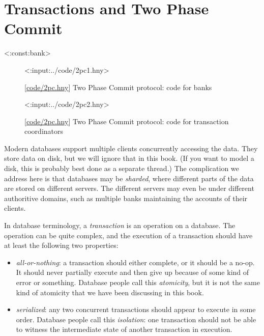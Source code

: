 \documentclass{report}
\newcommand{\harmonylink}[1]{%
[\href{https://harmony.cs.cornell.edu/#1}{\underline{#1}}]%
}
\newenvironment{code}{
\tcolorbox
}{
\endtcolorbox
}
\begin{document}
\chapter{Transactions and Two Phase Commit}
\label{ch:2pc}

<{:const:bank}>

\begin{figure}
\begin{code}
<{:input:../code/2pc1.hny}>
\end{code}
\caption{\harmonylink{code/2pc.hny} Two Phase Commit protocol: code for banks}
\label{fig:2pc1}
\end{figure}

\begin{figure}
\begin{code}
<{:input:../code/2pc2.hny}>
\end{code}
\caption{\harmonylink{code/2pc.hny} Two Phase Commit protocol: code for transaction coordinators}
\label{fig:2pc2}
\end{figure}

Modern databases support multiple clients concurrently accessing the data.
They store data on disk, but we will ignore that in this book.
(If you want to model a disk, this is probably best done as a separate
thread.)
The complication we address here is that databases may be \emph{sharded},
where different parts of the data are stored on different servers.
The different servers may even be under different
authoritive domains, such as multiple banks maintaining the accounts of their
clients.

In database terminology, a \emph{transaction} is an operation on a database.
The operation can be quite complex, and the execution of a transaction
should have at least the following two properties:
\begin{itemize}
\item \emph{all-or-nothing}: a transaction should either complete, or it should
be a no-op.  It should never partially execute and then give up because of
some kind of error or something.  Database
people call this \emph{atomicity}, but it is not the same kind of atomicity that
we have been discussing in this book.
\item \emph{serialized}: any two concurrent transactions should appear to
execute in some order.  Database people call this \emph{isolation}: one transaction
should not be able to witness the intermediate state of another transaction
in execution.
\end{itemize}
\end{document}

